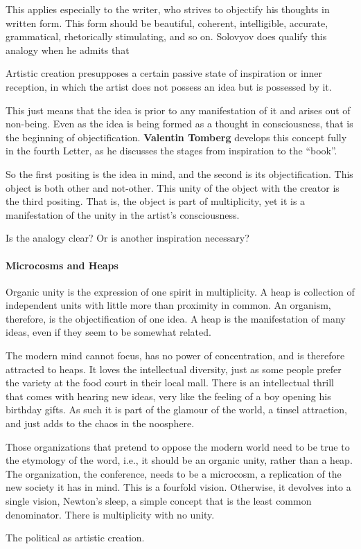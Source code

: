 This applies especially to the writer, who strives to objectify his thoughts in written form. This form should be beautiful, coherent, intelligible, accurate, grammatical, rhetorically stimulating, and so on. Solovyov does qualify this analogy when he admits that

\begin{quotex}
Artistic creation presupposes a certain passive state of inspiration or inner reception, in which the artist does not possess an idea but is possessed by it.
\end{quotex}


This just means that the idea is prior to any manifestation of it and arises out of non-being. Even as the idea is being formed as a thought in consciousness, that is the beginning of objectification.
\textbf{Valentin Tomberg} develops this concept fully in the fourth Letter, as he discusses the stages from inspiration to the ``book''.

So the first positing is the idea in mind, and the second is its objectification. This object is both other and not-other. This unity of the object with the creator is the third positing. That is, the object is part of multiplicity, yet it is a manifestation of the unity in the artist's consciousness.

Is the analogy clear? Or is another inspiration necessary?

\paragraph{Microcosms and Heaps}


Organic unity is the expression of one spirit in multiplicity. A heap is collection of independent units with little more than proximity in common. An organism, therefore, is the objectification of one idea. A heap is the manifestation of many ideas, even if they seem to be somewhat related.

The modern mind cannot focus, has no power of concentration, and is therefore attracted to heaps. It loves the intellectual diversity, just as some people prefer the variety at the food court in their local mall. There is an intellectual thrill that comes with hearing new ideas, very like the feeling of a boy opening his birthday gifts. As such it is part of the glamour of the world, a tinsel attraction, and just adds to the chaos in the noosphere.

Those organizations that pretend to oppose the modern world need to be true to the etymology of the word, i.e., it should be an organic unity, rather than a heap. The organization, the conference, needs to be a microcosm, a replication of the new society it has in mind. This is a fourfold vision. Otherwise, it devolves into a single vision, Newton's sleep, a simple concept that is the least common denominator. There is multiplicity with no unity.

The political as artistic creation.



